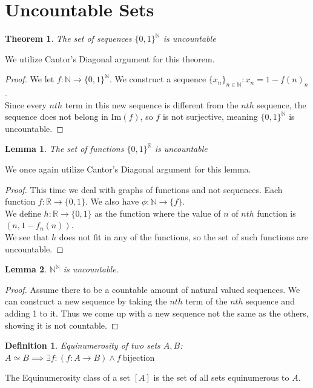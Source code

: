 \documentclass{article}
\newtheorem{thm}{Theorem}[section]
\newtheorem{lem}{Lemma}[section]
\newtheorem{defn}{Definition}[section]
\begin{document}
\pagebreak

\section{Uncountable Sets}
\begin{thm}
The set of sequences $\{0, 1\}^\mathbb{N}$ is uncountable
\end{thm}
We utilize Cantor's Diagonal argument for this theorem.
\begin{proof}
We let $f: \mathbb{N} \xrightarrow{} \{0, 1\}^\mathbb{N}$. We construct a sequence $\{x_n\}_{n \in \mathbb{N}}: x_n = 1 - f(n)_n$.\\

Since every $nth$ term in this new sequence is different from the $nth$ sequence, the sequence does not belong in $\text{Im}(f)$, so $f$ is not surjective, meaning $\{0, 1\}^\mathbb{N}$ is uncountable.
\end{proof}

\medskip
\begin{lem}
The set of functions $\{0, 1\}^\mathbb{R}$ is uncountable
\end{lem}
We once again utilize Cantor's Diagonal argument for this lemma.
\begin{proof}
This time we deal with graphs of functions and not sequences. Each function $f: \mathbb{R} \xrightarrow{} \{0, 1\}$. We also have $\phi: \mathbb{N} \xrightarrow{} \{f\}$.\\

We define $h: \mathbb{R} \xrightarrow{} \{0, 1\}$ as the function where the value of $n$ of $nth$ function is $(n, 1- f_n(n))$.\\

We see that $h$ does not fit in any of the functions, so the set of such functions are uncountable.
\end{proof}

\medskip
\begin{lem}
$\mathbb{N}^\mathbb{N}$ is uncountable.
\end{lem}
\begin{proof}
Assume there to be a countable amount of natural valued sequences. We can construct a new sequence by taking the $nth$ term of the $nth$ sequence and adding 1 to it. Thus we come up with a new sequence not the same as the others, showing it is not countable.
\end{proof}

\medskip
\begin{defn}
Equinumerosity of two sets $A, B$: $A \simeq B \implies \exists f: (f:A \xrightarrow{} B) \land f \ \text{bijection}$
\end{defn}
The Equinumerosity class of a set $[A]$ is the set of all sets equinumerous to $A$.
\end{document}
